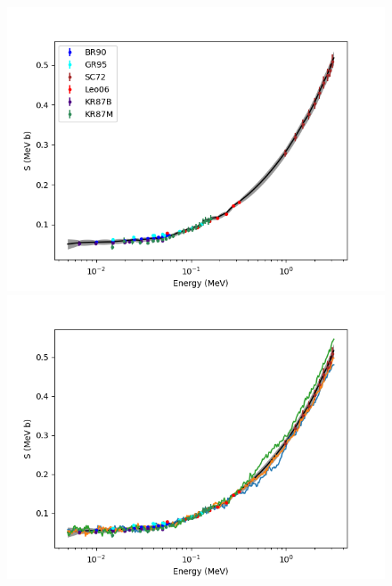 \documentclass[%
 reprint,
superscriptaddress,
nofootinbib,
 amsmath,amssymb,
 aps,
 pra,
]{revtex4-2}
\begin{document}
\begin{figure}
    	\centering
    	\begin{minipage}{.48\textwidth}
        		\centering
        		\includegraphics[width=\linewidth]{Figures/ddhe3n_S.png}
    	\end{minipage}
    	\hspace{0mm}
    	\begin{minipage}{.48\textwidth}
        		\centering
        		\includegraphics[width=\linewidth]{Figures/ddhe3n_S_samples.png}
    	\end{minipage}
    	\begin{minipage}{.48\textwidth}
    		\centering

\end{minipage}
\end{figure}
\end{document}
